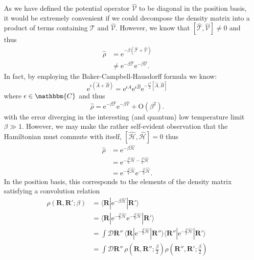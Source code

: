 \documentclass[prb,10pt,aps,floatfix,notitlepage]{revtex4-1}
\renewcommand{\vec}[1]{\boldsymbol{#1}}
\newcommand{\e}[1]{\mathrm{e}^{#1}}
\newcommand{\R}{\vec{R}}
\begin{document}
As we have defined the potential operator $\hat{\mathcal{V}}$ to be diagonal in
the position basis, it would be extremely convenient if we could decompose the
density matrix into a product of terms containing $\hat{\mathcal{T}}$ and
$\hat{\mathcal{V}}$.  However, we know that
$[\hat{\mathcal{T}},\hat{\mathcal{V}}] \ne 0$ and thus
%
\begin{align}
    \hat{\rho} &= \e{-\beta(\hat{\mathcal{T}} + \hat{\mathcal{V}})} \nonumber
    \\
&\ne \e{-\beta\hat{\mathcal{T}}}\e{-\beta\hat{\mathcal{V}}}.
\end{align}
%
In fact, by employing the Baker-Campbell-Hausdorff formula we know:
%
\begin{equation}
    \e{\epsilon(\hat{A}+\hat{B})} = \e{\epsilon\hat{A}}\e{\epsilon\hat{B}}
    \e{-\frac{\epsilon^2}{2}[\hat{A},\hat{B}]}
    \label{eq:BCH}
\end{equation}
%
where $\epsilon \in \mathbbm{C}$ and thus 
%
\begin{equation}
    \hat{\rho} = \e{-\beta\hat{\mathcal{T}}}\e{-\beta\hat{\mathcal{V}}} +
    \mathrm{O}\left(\beta^2\right).
\end{equation}
%
with the error diverging in the interesting (and quantum) low temperature limit
$\beta \gg 1$.  However, we may make the rather self-evident observation that
the Hamiltonian must commute with itself,
$[\hat{\mathcal{H}},\hat{\mathcal{H}}] = 0$ thus
%
\begin{align}
    \hat{\rho} &= \e{-\beta \hat{\mathcal{H}}} \nonumber \\
               &= \e{-\frac{\beta}{2}\hat{\mathcal{H}}
-\frac{\beta}{2}\hat{\mathcal{H}}} \nonumber \\
&= \e{-\frac{\beta}{2}\hat{\mathcal{H}}}\e{-\frac{\beta}{2}\hat{\mathcal{H}}}.
\label{eq:HamCommute}
\end{align}
%
In the position basis, this corresponds to the elements of the density matrix
satisfying a convolution relation
%
\begin{align}
    \rho(\R,\R';\beta) &=  \langle \R | \e{-\beta \hat{\mathcal{H}}} | \R'\rangle \nonumber \\
    &=  \langle \R | \e{-\frac{\beta}{2} \hat{\mathcal{H}}} 
    \e{-\frac{\beta}{2} \hat{\mathcal{H}}}| \R'\rangle \nonumber \\
    &= \int \mathcal{D}\R''\,
    \langle \R | \e{-\frac{\beta}{2} \hat{\mathcal{H}}} | \R''\rangle 
    \langle \R'' | \e{-\frac{\beta}{2} \hat{\mathcal{H}}} | \R'\rangle \nonumber \\
    &= \int \mathcal{D}\R''\,
    \rho\left(\R,\R'';\frac{\beta}{2}\right)
    \rho\left(\R'',\R';\frac{\beta}{2}\right)
\label{eq:rhoConvolution}
\end{align}
\end{document}
